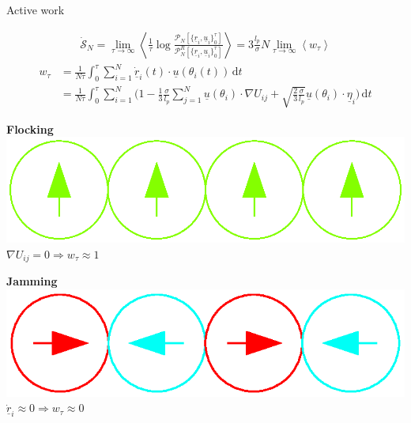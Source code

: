 \documentclass{beamer}
\begin{document}
\begin{frame}{Active work}

\vspace{-5pt}

\begin{align*}
\dot{\mathcal{S}}_N = \lim_{\tau \rightarrow \infty} \left<\frac{1}{\tau} \log\frac{\mathcal{P}_N\left[\{\underline{r}_i, \underline{u}_i\}_0^{\tau}\right]}{\mathcal{P}_N^R\left[\{\underline{r}_i, \underline{u}_i\}_0^{\tau}\right]}\right> = 3 \frac{l_p}{\sigma} N \lim_{\tau \rightarrow \infty} \left<w_{\tau}\right>
\end{align*}
\begin{align*}
w_{\tau} &= \frac{1}{N \tau} \int_0^{\tau} \sum_{i=1}^N \dot{\underline{r}}_i(t) \cdot \underline{u}(\theta_i(t)) \, \text{d}t\\
&= \frac{1}{N \tau} \int_0^{\tau} \sum_{i=1}^N \Bigg(1 - \frac{1}{3}\frac{\sigma}{l_p} \sum_{j=1}^N \underline{u}(\theta_i) \cdot \nabla U_{ij} + \sqrt{\frac{2}{3}\frac{\sigma}{l_p}} \underline{u}(\theta_i) \cdot \underline{\eta}_i\Bigg) \, \text{d}t
\end{align*}

\pause
\return
\return
\hfill
\begin{minipage}{0.4\linewidth}
\centering
\bf Flocking
\includegraphics[width=\linewidth]{w1.eps}
$\nabla U_{ij} = 0 \Rightarrow w_{\tau} \approx 1$
\end{minipage}
\hfill
\begin{minipage}{0.4\linewidth}
\centering
\bf Jamming
\includegraphics[width=\linewidth]{w0.eps}
$\dot{\underline{r}}_i \approx 0 \Rightarrow w_{\tau} \approx 0$
\end{minipage}
\hfill\hfill

\end{frame}
\end{document}
